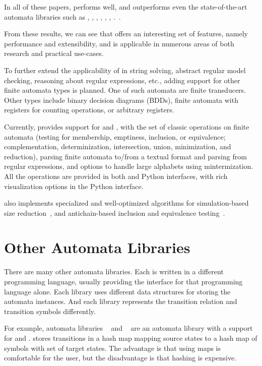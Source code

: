 In all of these papers, \mata performs well, and outperforms even the state-of-the-art automata libraries such as \automatajar, \awali, \vata, \brics, \automatanet, \automatapy, \fado.~\cite{tacas24_mata_10.1007/978-3-031-57249-4_7}.

From these results, we can see that \mata offers an interesting set of features, namely performance and extensibility, and is applicable in numerous areas of both research and practical use-cases.

To further extend the applicability of \mata in string solving, abstract regular model checking, reasoning about regular expressions, etc., adding support for other finite automata types is planned.
One of such automata are finite transducers.
Other types include binary decision diagrams (BDDs), finite automata with registers for counting operations, or arbitrary registers.

Currently, \mata provides support for \dfas and \nfas, with the set of classic operations on finite automata (testing for membership, emptiness, inclusion, or equivalence; complementation, determinization, intersection, union, minimization, and reduction),
parsing finite automata to/from a textual format and parsing \nfas from regular expressions, and options to handle large alphabets using mintermization.
All the operations are provided in both \cpp and Python interfaces, with rich visualization options in the Python interface.

\mata also implements specialized and well-optimized algorithms for simulation-based size reduction~\cite{ranzato_efficient_2010, treesimulation08}, and antichain-based inclusion and equivalence testing~\cite{doyen-antichain-10}.


\section{Other Automata Libraries}
There are many other automata libraries.
Each is written in a different programming language, usually providing the interface for that programming language alone.
Each library uses different data structures for storing the automata instances.
And each library represents the transition relation and transition symbols differently.

For example, automata libraries \fado~\cite{fado} and \automatapy~\cite{automatapy} are an automata library with a support for \nfas and \dfas.
\automatapy stores transitions in a hash map mapping source states to a hash map of symbols with set of target states.
The advantage is that using maps is comfortable for the user, but the disadvantage is that hashing is expensive.

